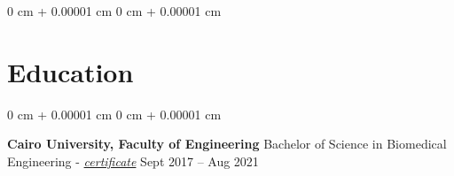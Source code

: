 \documentclass[10pt, letterpaper]{article}
\newenvironment{highlights}{
    \begin{itemize}[
        topsep=0.10 cm,
        parsep=0.10 cm,
        partopsep=0pt,
        itemsep=0pt,
        leftmargin=0 cm + 10pt
    ]
}{
    \end{itemize}
} %
\newenvironment{onecolentry}{
    \begin{adjustwidth}{
        0 cm + 0.00001 cm
    }{
        0 cm + 0.00001 cm
    }
}{
    \end{adjustwidth}
} %
\newenvironment{twocolentry}[2][]{
    \onecolentry
    \def\secondColumn{#2}
    \setcolumnwidth{\fill, 4.5 cm}
    \begin{paracol}{2}
}{
    \switchcolumn \raggedleft \secondColumn
    \end{paracol}
    \endonecolentry
} %
\begin{document}
\begin{onecolentry}
\begin{highlights}
            \end{highlights}
        \end{onecolentry}
    \vspace{0.1 cm}

    \section{Education}
        \begin{twocolentry}{
            Sept 2017 – Aug 2021
        }    
            \textbf{Cairo University, Faculty of Engineering} \newline Bachelor of Science in Biomedical Engineering - \href{https://drive.google.com/file/d/1ebMfVvXX2HhpQ__EYm0ddEoKS-hMXUMt/view?usp=sharing}{\textit{certificate}} \end{twocolentry}
\end{document}
